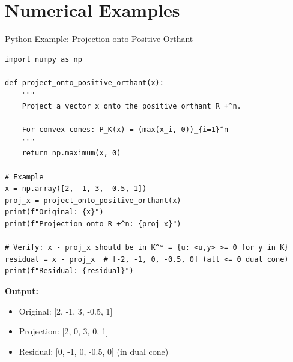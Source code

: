 \documentclass[aspectratio=169,10pt]{beamer}
\begin{document}
\section{Numerical Examples}

\begin{frame}[fragile]{Python Example: Projection onto Positive Orthant}
\begin{lstlisting}
import numpy as np

def project_onto_positive_orthant(x):
    """
    Project a vector x onto the positive orthant R_+^n.

    For convex cones: P_K(x) = (max(x_i, 0))_{i=1}^n
    """
    return np.maximum(x, 0)

# Example
x = np.array([2, -1, 3, -0.5, 1])
proj_x = project_onto_positive_orthant(x)
print(f"Original: {x}")
print(f"Projection onto R_+^n: {proj_x}")

# Verify: x - proj_x should be in K^* = {u: <u,y> >= 0 for y in K}
residual = x - proj_x  # [-2, -1, 0, -0.5, 0] (all <= 0 dual cone)
print(f"Residual: {residual}")
\end{lstlisting}

\vspace{0.3cm}

\textbf{Output:}
\begin{itemize}
    \item Original: [2, -1, 3, -0.5, 1]
    \item Projection: [2, 0, 3, 0, 1]
    \item Residual: [0, -1, 0, -0.5, 0] (in dual cone)
\end{itemize}
\end{frame}
\end{document}
